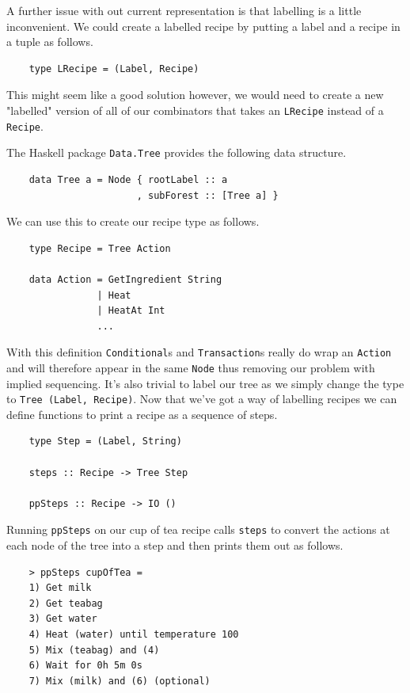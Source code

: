 \documentclass[11pt]{article}
\begin{document}
\medbreak

A further issue with out current representation is that labelling is a little inconvenient.
We could create a labelled recipe by putting a label and a recipe in a tuple as follows.

\begin{lstlisting}
    type LRecipe = (Label, Recipe)
\end{lstlisting}

This might seem like a good solution however, we would need to create a new "labelled"
version of all of our combinators that takes an \texttt{LRecipe} instead of a \texttt{Recipe}.

\medbreak

The Haskell package \texttt{Data.Tree} provides the following data structure.

\begin{lstlisting}
    data Tree a = Node { rootLabel :: a
                       , subForest :: [Tree a] }
\end{lstlisting}

We can use this to create our recipe type as follows.

\begin{lstlisting}
    type Recipe = Tree Action

    data Action = GetIngredient String
                | Heat
                | HeatAt Int
                ...
\end{lstlisting}

With this definition \texttt{Conditional}s and \texttt{Transaction}s really do wrap an
\texttt{Action} and will therefore appear in the same \texttt{Node} thus removing our
problem with implied sequencing. It's also trivial to label our tree as we simply
change the type to \texttt{Tree (Label, Recipe)}. Now that we've got a way of
labelling recipes we can define functions to print a recipe as a sequence of steps.

\begin{lstlisting}
    type Step = (Label, String)

    steps :: Recipe -> Tree Step

    ppSteps :: Recipe -> IO ()
\end{lstlisting}

Running \texttt{ppSteps} on our cup of tea recipe calls \texttt{steps} to convert
the actions at each node of the tree into a step and then prints them out as follows.

\begin{lstlisting}
    > ppSteps cupOfTea =
    1) Get milk
    2) Get teabag
    3) Get water
    4) Heat (water) until temperature 100
    5) Mix (teabag) and (4)
    6) Wait for 0h 5m 0s
    7) Mix (milk) and (6) (optional)
\end{lstlisting}
\end{document}
